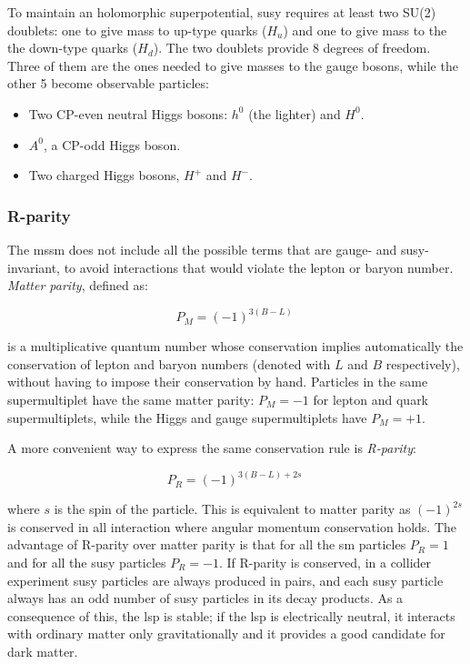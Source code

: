 To maintain an holomorphic superpotential, \gls{susy} requires at least two SU(2) doublets: one to give mass to up-type quarks ($H_u$) and one to give mass to the the down-type quarks ($H_d$). The two doublets provide 8 degrees of freedom. Three of them are the ones needed to give masses to the gauge bosons, while the other 5 become observable particles:
\begin{itemize}
\item Two CP-even neutral Higgs bosons: $h^0$ (the lighter) and $H^0$.
\item $A^0$, a CP-odd Higgs boson.
\item Two charged Higgs bosons, $H^+$ and $H^-$.
\end{itemize}


\subsubsection*{R-parity}

The \gls{mssm} does not include all the possible terms that are gauge- and \gls{susy}-invariant, to avoid interactions that would violate the lepton or baryon number. \textit{Matter parity}, defined as:

\begin{equation}
P_M = (-1)^{3 (B-L)} \;
\label{eq:defmatterparity}
\end{equation}

\noindent is a multiplicative quantum number whose conservation implies automatically the conservation of lepton and baryon numbers (denoted with $L$ and $B$ respectively), without having to impose their conservation by hand. Particles in the same supermultiplet have the same matter parity: $P_M =-1$ for lepton and quark supermultiplets, while the Higgs and gauge supermultiplets have $P_M =+1$.

A more convenient way to express the same conservation rule is \textit{R-parity}:

\begin{equation}
P_R = (-1)^{3(B-L) + 2 s} \;
\label{eq:defRparity}
\end{equation}

\noindent where $s$ is the spin of the particle. This is equivalent to matter parity as $(-1)^{2s}$ is conserved in all interaction where angular momentum conservation holds. The advantage of R-parity over matter parity is that for all the \gls{sm} particles $P_R = 1$ and for all the \gls{susy} particles $P_R=-1$. If  R-parity is conserved, in a collider experiment \gls{susy} particles are always produced in pairs, and each \gls{susy} particle always has an odd number of \gls{susy} particles in its decay products. As a consequence of this, the \gls{lsp} is stable; if the \gls{lsp} is electrically neutral, it interacts with ordinary matter only gravitationally and it provides a good candidate for dark matter.

